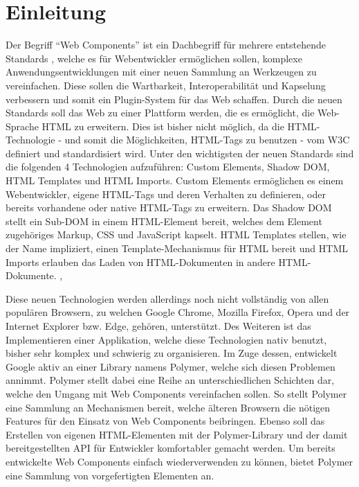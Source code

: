 \chapter{Einleitung}\label{einleitung}

Der Begriff ``Web Components'' ist ein Dachbegriff für mehrere entstehende Standards \cite{citeulike:13844988}, welche es für Webentwickler ermöglichen sollen, komplexe Anwendungsentwicklungen mit einer neuen Sammlung an Werkzeugen zu vereinfachen. Diese sollen die Wartbarkeit, Interoperabilität und Kapselung verbessern und somit ein Plugin-System für das Web schaffen. Durch die neuen Standards soll das Web zu einer Plattform werden, die es ermöglicht, die Web-Sprache \ac{HTML} zu erweitern. Dies ist bisher nicht möglich, da die \ac{HTML}-Technologie - und somit die Möglichkeiten, \ac{HTML}-Tags zu benutzen - vom \ac{W3C} definiert und standardisiert wird. Unter den wichtigsten der neuen Standards sind die folgenden 4 Technologien aufzuführen: Custom Elements, Shadow \ac{DOM}, \ac{HTML} Templates und \ac{HTML} Imports. Custom Elements ermöglichen es einem Webentwickler, eigene \ac{HTML}-Tags und deren Verhalten zu definieren, oder bereits vorhandene oder native \ac{HTML}-Tags zu erweitern. Das Shadow \ac{DOM} stellt ein Sub-\ac{DOM} in einem \ac{HTML}-Element bereit, welches dem Element zugehöriges Markup, \ac{CSS} und JavaScript kapselt. \ac{HTML} Templates stellen, wie der Name impliziert, einen Template-Mechanismus für \ac{HTML} bereit und \ac{HTML} Imports erlauben das Laden von \ac{HTML}-Dokumenten in andere \ac{HTML}-Dokumente. \cite{citeulike:13842702}, \cite{citeulike:13842701}

Diese neuen Technologien werden allerdings noch nicht vollständig von allen populären Browsern, zu welchen Google Chrome, Mozilla Firefox, Opera und der Internet Explorer bzw. Edge, gehören, unterstützt. Des Weiteren ist das Implementieren einer Applikation, welche diese Technologien nativ benutzt, bisher sehr komplex und schwierig zu organisieren. Im Zuge dessen, entwickelt Google aktiv an einer Library namens Polymer, welche sich diesen Problemen annimmt.
Polymer stellt dabei eine Reihe an unterschiedlichen Schichten dar, welche den Umgang mit Web Components vereinfachen sollen. So stellt Polymer eine Sammlung an Mechanismen bereit, welche älteren Browsern die nötigen Features für den Einsatz von Web Components beibringen. Ebenso soll das Erstellen von eigenen \ac{HTML}-Elementen mit der Polymer-Library und der damit bereitgestellten \ac{API} für Entwickler komfortabler gemacht werden. Um bereits entwickelte Web Components einfach wiederverwenden zu können, bietet Polymer eine Sammlung von vorgefertigten Elementen an.

